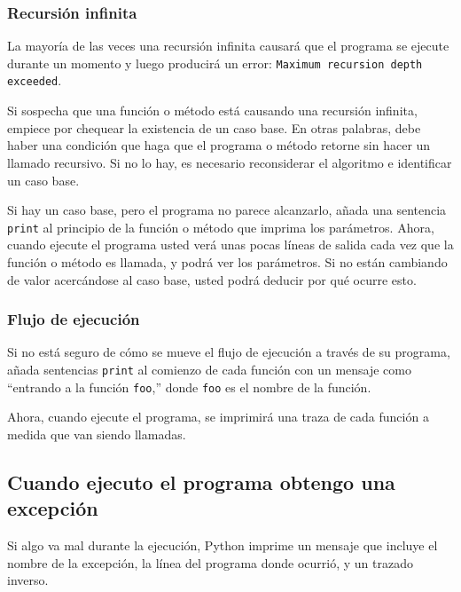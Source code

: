 \subsubsection{Recursión infinita}

La mayoría de las veces una recursión infinita causará que
el programa se ejecute durante un momento y luego producirá
un error: \texttt{Maximum recursion depth exceeded}.

Si sospecha que una función o método está causando una 
recursión infinita, empiece por chequear la existencia de
un caso base. En otras palabras, debe haber una condición
que haga que el programa o método retorne sin hacer un
llamado recursivo. Si no lo hay, es necesario reconsiderar
el algoritmo e identificar un caso base.

Si hay un caso base, pero el programa no parece alcanzarlo,
añada una sentencia \texttt{print} al principio de la 
función o método que imprima los parámetros. Ahora, cuando
ejecute el programa usted verá unas pocas líneas de salida
cada vez que la función o método es llamada, y podrá ver
los parámetros. Si no están cambiando de valor acercándose
al caso base, usted podrá deducir por qué ocurre esto.


\subsubsection{Flujo de ejecución}

Si no está seguro de cómo se mueve el flujo de ejecución a través
de su programa, añada sentencias \texttt{print} al comienzo 
de cada función con un mensaje como  ``entrando a la función \texttt{foo},'' 
donde \texttt{foo} es el nombre de la función.

Ahora, cuando ejecute el programa, se imprimirá una traza de cada
función a medida que van siendo llamadas.

\subsection{Cuando ejecuto el programa obtengo una excepción}

Si algo va mal durante la ejecución, Python imprime un mensaje
que incluye el nombre de la excepción, la línea del programa
donde ocurrió, y un trazado inverso.


